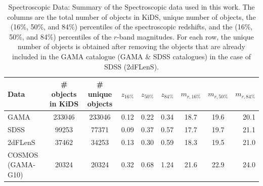 \documentclass{aa}
\numberwithin{equation}{section}
\begin{document}
\begin{table}
	\centering
	\caption{{ Spectroscopic Data: Summary of the Spectroscopic data used in this work. The columns are the total number of objects in KiDS, unique number of objects, the (16\%, 50\%, and 84\%) percentiles of the spectroscopic redshifts, and the (16\%, 50\%, and 84\%) percentiles of the $r$-band magnitudes. For each row, the unique number of objects is obtained after removing the objects that are already included in the GAMA catalogue (GAMA \& SDSS catalogues) in the case of SDSS (2dFLenS).} 
    }
	\label{tab:zspec}
	\begin{tabularx}{1.95\columnwidth}{lcccccccr} %
		\hline
		Data &  \# objects in KiDS & \# unique objects & $z_{16\%}$ & $z_{50\%}$ & $z_{84\%}$ & $m_{r, 16\%}$ & $m_{r, 50\%}$ & $m_{r, 84\%}$\\
		\hline
		GAMA     & 233046 & 233046 & 0.12  & 0.22 & 0.34 & 18.7 & 19.6 & 20.1  \\
		SDSS     & 99253 &  77371  & 0.09  & 0.37 & 0.57 & 17.7 & 19.7 & 21.1  \\
        2dFLenS  & 37462 &  34253  & 0.13  & 0.30 & 0.59 & 18.3 & 19.5 & 21.0  \\
        COSMOS (GAMA-G10)   & 20324 &  20324  & 0.32 & 0.68 & 1.24 & 21.6 & 22.9 & 24.0 \\
		\hline
	\end{tabularx}
\end{table}




\end{document}
